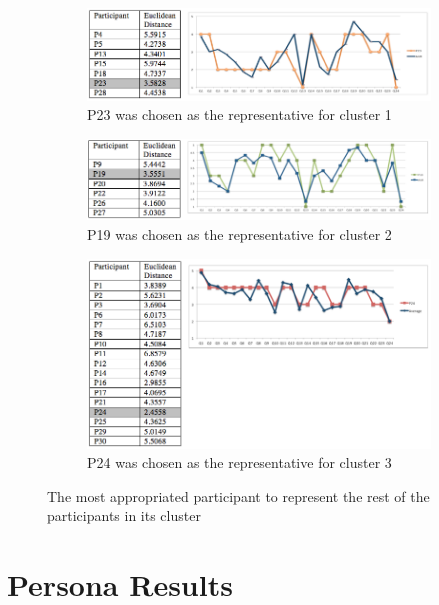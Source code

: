 \newpage
\begin{figure}[!hbt]\centering
    \begin{subfigure}{1\textwidth}
 \includegraphics[width=\textwidth]{persona4a}
 \caption{P23 was chosen as the representative for cluster 1}
    \end{subfigure}
    \begin{subfigure}{1\textwidth}
\includegraphics[width=\textwidth]{persona4b}
  \caption{P19 was chosen as the representative for cluster 2}
    \end{subfigure}
    \begin{subfigure}{1\textwidth}
        \includegraphics[width=\textwidth]{persona4c}
        \caption{P24 was chosen as the representative for cluster 3}
    \end{subfigure}
    \caption{The most appropriated participant to represent the rest of the participants in its cluster}
\end{figure}

\newpage 
\section {Persona Results}

